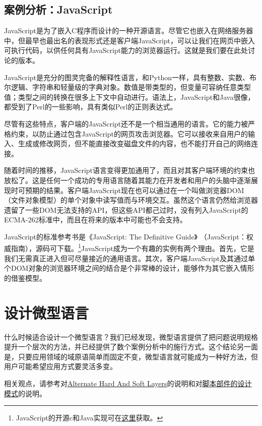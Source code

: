 \documentclass[12pt,oneside]{book}
\begin{document}
\begin{common-format}
\subsection{案例分析：JavaScript}
JavaScript是为了嵌入C程序而设计的一种开源语言。尽管它也嵌入在网络服务器中，但最早也最出名的表现形式还是客户端JavaScript，可以让我们在网页中嵌入可执行代码，以供任何具有JavaScript能力的浏览器运行。这就是我们要在此处讨论的版本。

JavaScript是充分的图灵完备的解释性语言，和Python一样，具有整数、实数、布尔逻辑、字符串和轻量级的字典对象。数值是带类型的，但变量可容纳任意类型值；类型之间的转换在很多上下文中自动进行。语法上，JavaScript和Java很像，都受到了Perl的一些影响，具有类似Perl的正则表达式。

尽管有这些特点，客户端的JavaScript还不是一个相当通用的语言。它的能力被严格约束，以防止通过包含JavaScript的网页攻击浏览器。它可以接收来自用户的输入、生成或修改网页，但不能直接改变磁盘文件的内容，也不能打开自己的网络连接。

随着时间的推移，JavaScript语言变得更加通用了，而且对其客户端环境的约束也放松了。这是任何一个成功的专用语言随着其能力在开发者和用户的头脑中逐渐展现时可预期的结果。客户端JavaScript现在也可以通过在一个叫做浏览器DOM（文件对象模型）的单个对象中读写值而与环境交互。虽然这个语言仍然给浏览器遗留了一些DOM无法支持的API，但这些API都己过时，没有列入JavaScript的ECMA-262标准中，而且在将来的版本中可能也不会支持。

JavaScript的标准参考书是《JavaScript: The Definitive Guide》 （JavaScript：权威指南）\cite{FlanaganJavaScript}，源码可下载。\footnote{JavaScript的开源c和Java实现可在\href{http://www.mozilla.org/js/}{这里}获取。}JavaScript成为一个有趣的实例有两个理由。首先，它是我们无需真正进入但可尽量接近的通用语言。其次，客户端JavaScript及其通过单个DOM对象的浏览器环境之间的结合是个非常棒的设计，能够作为其它嵌入情形的借鉴模型。



\section{设计微型语言}
什么时候适合设计一个微型语言？我们已经发现，微型语言提供了把问题说明规格提升一个层次的方法，并已经提供了数个案例分析中的施行方式。这个结论另一面是，只要应用领域的域原语简单而固定不变，微型语言就可能成为一种好方法，但用户可能希望应用方式要灵活多变。

相关观点，请参考对\href{http://www.c2.com/cgi/wiki?AlternateHardAndSoftLayers}{Alternate  Hard  And  Soft  Layers}的说明和对\href{http://www.doc.ic.ac.uk/~np2/patterns/scripting/scripting.html}{脚本部件的设计模式}的说明。


\end{common-format}
\end{document}

